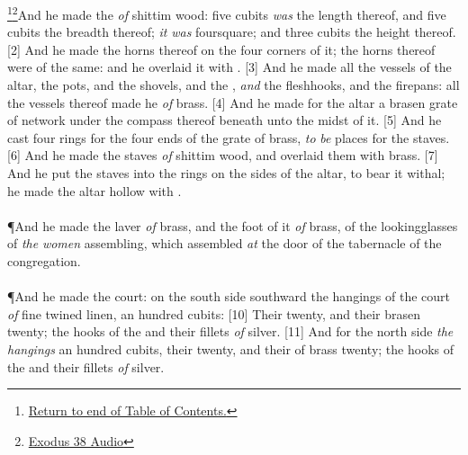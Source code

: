 \footnote{\textcolor[cmyk]{0.99998,1,0,0}{\hyperlink{TOC}{Return to end of Table of Contents.}}}\footnote{\href{https://audiobible.com/bible/exodus_38.html}{\textcolor[cmyk]{0.99998,1,0,0}{Exodus 38 Audio}}}\textcolor[cmyk]{0.99998,1,0,0}{And he made the  \emph{of} shittim wood: five cubits \emph{was} the length thereof, and five cubits the breadth thereof; \emph{it} \emph{was} foursquare; and three cubits the height thereof.}
[2] \textcolor[cmyk]{0.99998,1,0,0}{And he made the horns thereof on the four corners of it; the horns thereof were of the same: and he overlaid it with .}
[3] \textcolor[cmyk]{0.99998,1,0,0}{And he made all the vessels of the altar, the pots, and the shovels, and the , \emph{and} the fleshhooks, and the firepans: all the vessels thereof made he \emph{of} brass.}
[4] \textcolor[cmyk]{0.99998,1,0,0}{And he made for the altar a brasen grate of network under the compass thereof beneath unto the midst of it.}
[5] \textcolor[cmyk]{0.99998,1,0,0}{And he cast four rings for the four ends of the grate of brass, \emph{to} \emph{be} places for the staves.}
[6] \textcolor[cmyk]{0.99998,1,0,0}{And he made the staves \emph{of} shittim wood, and overlaid them with brass.}
[7] \textcolor[cmyk]{0.99998,1,0,0}{And he put the staves into the rings on the sides of the altar, to bear it withal; he made the altar hollow with .}\\
\\
\P \textcolor[cmyk]{0.99998,1,0,0}{And he made the laver \emph{of} brass, and the foot of it \emph{of} brass, of the lookingglasses of \emph{the} \emph{women} assembling, which assembled \emph{at} the door of the tabernacle of the congregation.}\\
\\
\P \textcolor[cmyk]{0.99998,1,0,0}{And he made the court: on the south side southward the hangings of the court  \emph{of} fine twined linen, an hundred cubits:}
[10] \textcolor[cmyk]{0.99998,1,0,0}{Their   twenty, and their brasen  twenty; the hooks of the  and their fillets  \emph{of} silver.}
[11] \textcolor[cmyk]{0.99998,1,0,0}{And for the north side \emph{the} \emph{hangings}  an hundred cubits, their   twenty, and their  of brass twenty; the hooks of the  and their fillets \emph{of} silver.}
